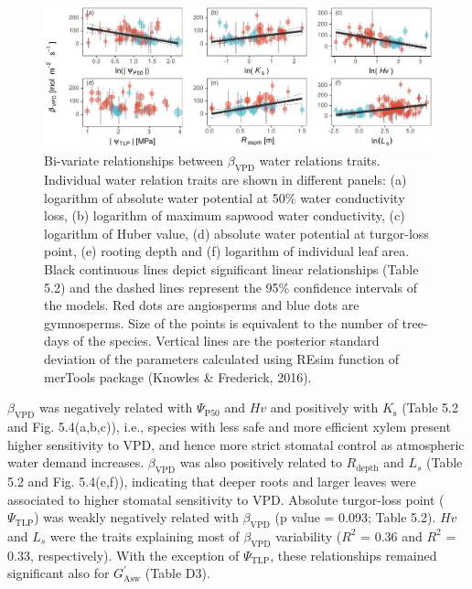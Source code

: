 \documentclass[11pt,twoside]{reedthesis}
\begin{document}
\begin{figure}[hbt!]

{\centering \includegraphics[width=1\linewidth]{figure/CH5/Figure_4} 

}

\caption[Bi-variate relationships between $\beta_{\text{VPD}}$ water relations traits.]{Bi-variate relationships between \(\beta_{\text{VPD}}\)
water relations traits. Individual water relation traits are shown in
different panels: (a) logarithm of absolute water potential at 50\%
water conductivity loss, (b) logarithm of maximum sapwood water
conductivity, (c) logarithm of Huber value, (d) absolute water potential
at turgor-loss point, (e) rooting depth and (f) logarithm of individual
leaf area. Black continuous lines depict significant linear
relationships (Table 5.2) and the dashed lines represent the 95\%
confidence intervals of the models. Red dots are angiosperms and blue
dots are gymnosperms. Size of the points is equivalent to the number of
tree-days of the species. Vertical lines are the posterior standard
deviation of the parameters calculated using REsim function of merTools
package (Knowles \& Frederick, 2016).}\label{fig:ch5fig4}
\end{figure}
\(\beta_{\text{VPD}}\) was negatively related with
\textbar{}\(\Psi_{\text{P50}}\)\textbar{} and \(Hv\) and positively with
\(K_\text{s}\) (Table 5.2 and Fig. 5.4(a,b,c)), i.e., species with less
safe and more efficient xylem present higher sensitivity to VPD, and
hence more strict stomatal control as atmospheric water demand
increases. \(\beta_{\text{VPD}}\) was also positively related to
\(R_{\text{depth}}\) and \(L_s\) (Table 5.2 and Fig. 5.4(e,f)),
indicating that deeper roots and larger leaves were associated to higher
stomatal sensitivity to VPD. Absolute turgor-loss point
(\textbar{}\(\Psi_{\text{TLP}}\)\textbar{}) was weakly negatively
related with \(\beta_{\text{VPD}}\) (p value = 0.093; Table 5.2). \(Hv\)
and \(L_s\) were the traits explaining most of \(\beta_{\text{VPD}}\)
variability (\(R^2\) = 0.36 and \(R^2\) = 0.33, respectively). With the
exception of \(\Psi_{\text{TLP}}\), these relationships remained
significant also for \(G_{\text{Asw}}^{'}\) (Table D3).\par
\end{document}
